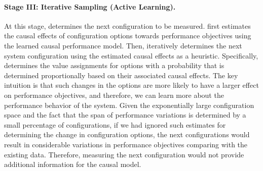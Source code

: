



\paragraph{Stage III: Iterative Sampling (Active Learning).}
\label{sect:path_discovery}



At this stage, \ourapproach determines the next configuration to be measured. 
\ourapproach first estimates the causal effects of configuration options towards performance objectives using the learned causal performance model. Then, \ourapproach iteratively determines the next system configuration using the estimated causal effects as a heuristic. Specifically, \ourapproach determines the value assignments for options with a probability that is determined proportionally based on their associated causal effects. The key intuition is that such changes in the options are more likely to have a larger effect on performance objectives, and therefore, we can learn more about the performance behavior of the system. Given the exponentially large configuration space and the fact that the span of performance variations is determined by a small percentage of configurations, if we had ignored such estimates for determining the change in configuration options, the next configurations would result in considerable variations in performance objectives comparing with the existing data. Therefore, measuring the next configuration would not provide additional information for the causal model. 

